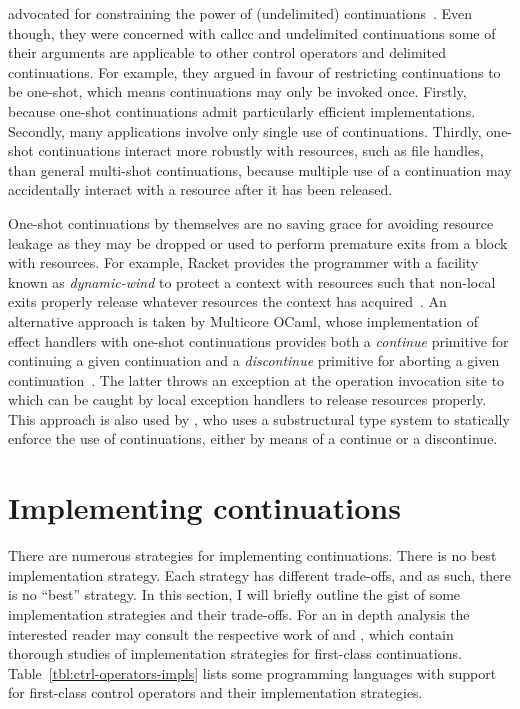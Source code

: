 \documentclass[12pt,phd,lfcs,twoside,openright,logo,leftchapter,normalheadings]{infthesis}
\theoremstyle{plain}
\theoremstyle{definition}
\begin{document}
\citet{FriedmanH85} advocated for constraining the power of
(undelimited) continuations~\cite{HaynesF87}.
%
Even though, they were concerned with callcc and undelimited
continuations some of their arguments are applicable to other control
operators and delimited continuations.
%
For example, they argued in favour of restricting continuations to be
one-shot, which means continuations may only be invoked once. Firstly,
because one-shot continuations admit particularly efficient
implementations. Secondly, many applications involve only single use
of continuations. Thirdly, one-shot continuations interact more
robustly with resources, such as file handles, than general multi-shot
continuations, because multiple use of a continuation may accidentally
interact with a resource after it has been released.

One-shot continuations by themselves are no saving grace for avoiding
resource leakage as they may be dropped or used to perform premature
exits from a block with resources. For example, Racket provides the
programmer with a facility known as \emph{dynamic-wind} to protect a
context with resources such that non-local exits properly release
whatever resources the context has acquired~\cite{Flatt20}.
%
An alternative approach is taken by Multicore OCaml, whose
implementation of effect handlers with one-shot continuations provides
both a \emph{continue} primitive for continuing a given continuation
and a \emph{discontinue} primitive for aborting a given
continuation~\cite{DolanWSYM15,DolanEHMSW17}. The latter throws an
exception at the operation invocation site to which can be caught by
local exception handlers to release resources properly.
%
This approach is also used by \citet{Fowler19}, who uses a
substructural type system to statically enforce the use of
continuations, either by means of a continue or a discontinue.


\section{Implementing continuations}
\label{sec:implementing-continuations}

There are numerous strategies for implementing continuations. There is
no best implementation strategy. Each strategy has different
trade-offs, and as such, there is no ``best'' strategy. In this
section, I will briefly outline the gist of some implementation
strategies and their trade-offs. For an in depth analysis the
interested reader may consult the respective work of
\citet{ClingerHO88} and \citet{FarvardinR20}, which contain thorough
studies of implementation strategies for first-class continuations.
%
Table~\ref{tbl:ctrl-operators-impls} lists some programming languages
with support for first-class control operators and their
implementation strategies.
\end{document}
